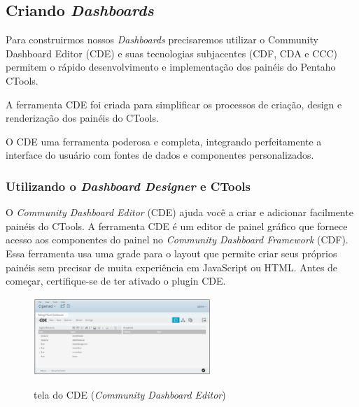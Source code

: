 
\subsection{Criando \textit{Dashboards}}

Para construirmos nossos \textit{Dashboards} precisaremos utilizar o  Community Dashboard Editor (CDE) e suas tecnologias subjacentes (CDF, CDA e CCC) permitem o r\'{a}pido desenvolvimento e implementa\c{c}\~{a}o dos pain\'{e}is do Pentaho CTools. 

A ferramenta CDE foi criada para simplificar os processos de cria\c{c}\~{a}o, design e renderiza\c{c}\~{a}o dos pain\'{e}is do CTools.

O CDE uma ferramenta poderosa e completa, integrando perfeitamente a interface do usu\'{a}rio com fontes de dados e componentes personalizados.

\subsubsection{Utilizando o \textit{Dashboard Designer} e CTools}

O \textit{Community Dashboard Editor} (CDE) ajuda você a criar e adicionar facilmente pain\'{e}is do CTools. A ferramenta CDE \'{e} um editor de painel gr\'{a}fico que fornece acesso aos componentes do painel no \textit{Community Dashboard Framework} (CDF). Essa ferramenta usa uma grade para o layout que permite criar seus pr\'oprios pain\'{e}is sem precisar de muita experiência em JavaScript ou HTML. Antes de come\c{c}ar, certifique-se de ter ativado o plugin CDE.

\begin{figure}[H]
	\vspace*{0,2cm}
    \centering
    \caption{tela do CDE (\textit{Community Dashboard Editor})}
    \includegraphics[width=0.6\textwidth]{./04-figuras/figura-cde}
    \label{fig:ilustfigcde}
\end{figure}
\vspace*{-0,9cm}
{\raggedright {}} \\

